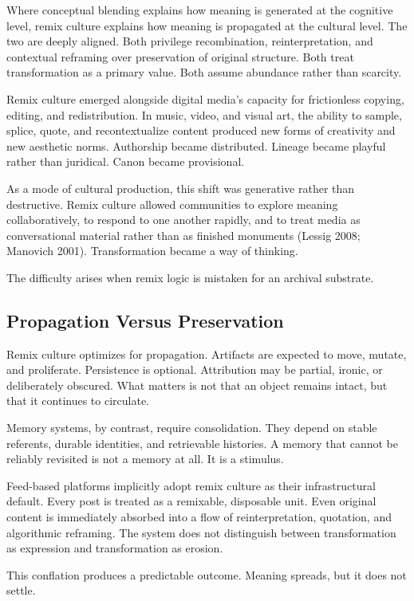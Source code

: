 \documentclass[11pt,oneside]{article}
\begin{document}
Where conceptual blending explains how meaning is generated at the cognitive level, remix culture explains how meaning is propagated at the cultural level. The two are deeply aligned. Both privilege recombination, reinterpretation, and contextual reframing over preservation of original structure. Both treat transformation as a primary value. Both assume abundance rather than scarcity.

Remix culture emerged alongside digital media’s capacity for frictionless copying, editing, and redistribution. In music, video, and visual art, the ability to sample, splice, quote, and recontextualize content produced new forms of creativity and new aesthetic norms. Authorship became distributed. Lineage became playful rather than juridical. Canon became provisional.

As a mode of cultural production, this shift was generative rather than destructive. Remix culture allowed communities to explore meaning collaboratively, to respond to one another rapidly, and to treat media as conversational material rather than as finished monuments (Lessig 2008; Manovich 2001). Transformation became a way of thinking.

The difficulty arises when remix logic is mistaken for an archival substrate.

\subsection{Propagation Versus Preservation}

Remix culture optimizes for propagation. Artifacts are expected to move, mutate, and proliferate. Persistence is optional. Attribution may be partial, ironic, or deliberately obscured. What matters is not that an object remains intact, but that it continues to circulate.

Memory systems, by contrast, require consolidation. They depend on stable referents, durable identities, and retrievable histories. A memory that cannot be reliably revisited is not a memory at all. It is a stimulus.

Feed-based platforms implicitly adopt remix culture as their infrastructural default. Every post is treated as a remixable, disposable unit. Even original content is immediately absorbed into a flow of reinterpretation, quotation, and algorithmic reframing. The system does not distinguish between transformation as expression and transformation as erosion.

This conflation produces a predictable outcome. Meaning spreads, but it does not settle.
\end{document}

